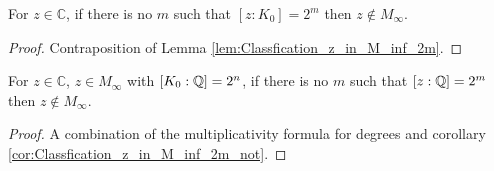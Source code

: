 \begin{corollary}
    \label{cor:Classfication_z_in_M_inf_2m_not}
    \leanok
    For $z \in \mathbb{C}$, if there is no $m$ such that $[z:K_0] = 2^m$ then $z \notin M_{\infty}$.
\end{corollary}

\begin{proof}
    Contraposition of Lemma \ref{lem:Classfication_z_in_M_inf_2m}.
\end{proof}

\begin{corollary}
    \label{cor:Classfication_z_in_M_inf_2m_rat}
    For $z \in \mathbb{C}$, $z \in M_{\infty}$ with $[K_0:\mathbb{Q}] = 2^n$,  if there is no $m$ such that $[z:\mathbb{Q}] = 2^m$ then $z \notin M_{\infty}$.
\end{corollary}

\begin{proof}
    A combination of the multiplicativity formula for degrees and corollary \ref{cor:Classfication_z_in_M_inf_2m_not}.
\end{proof}